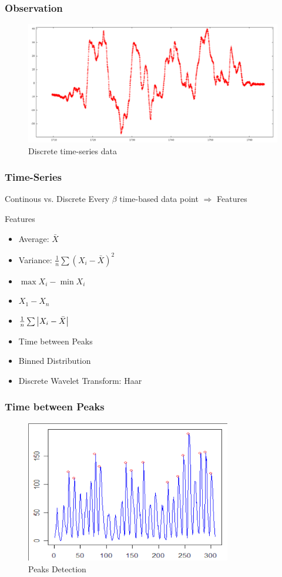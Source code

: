 \documentclass[11pt,slidestop,mathserif,compress]{beamer}
\begin{document}
\begin{frame}
	\frametitle{Observation}
	\begin{figure}[H]
		\centering
		\includegraphics[width=1.0\textwidth]{A.png}
		\caption{Discrete time-series data}
	\end{figure}
\end{frame}

\begin{frame}
	\frametitle{Time-Series}
	\begin{block}{Continous vs. Discrete}
		Every $\beta$ time-based data point $\Rightarrow$ Features
	\end{block}
	\begin{exampleblock}{Features}
		\begin{itemize}
			\item	Average: $\bar{X}$
			\item	Variance: $\frac{1}{n} \sum (X_i - \bar{X})^2$
			\item	$\max{X_i} - \min{X_i}$
			\item	$X_1 - X_n$
			\item	$\frac{1}{n}\sum \left\lvert X_i - \bar{X} \right\rvert$
			\item	Time between Peaks
			\item	Binned Distribution
			\item	Discrete Wavelet Transform: Haar
		\end{itemize}
	\end{exampleblock}
\end{frame}

\begin{frame}
	\frametitle{Time between Peaks}
	\begin{figure}[H]
		\centering
		\includegraphics[width=0.8\textwidth]{C.png}
		\caption{Peaks Detection}
	\end{figure}
\end{frame}
\end{document}
